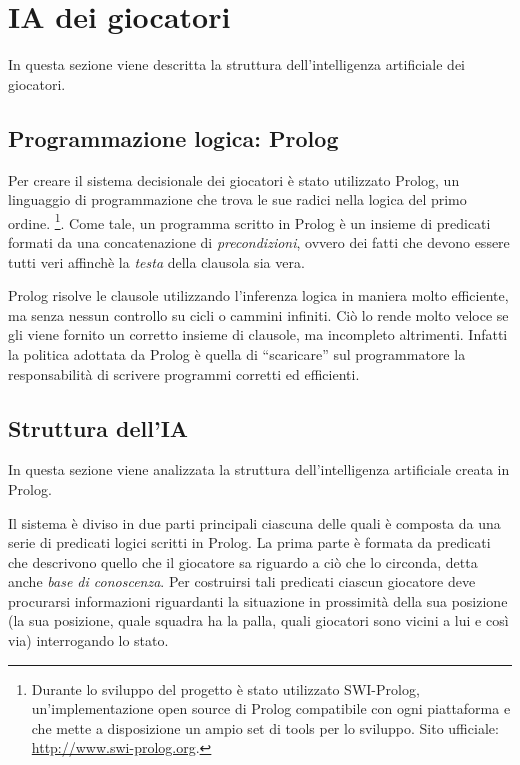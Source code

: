 
\section{IA dei giocatori}
\label{sec:ai_giocatori}

In questa sezione viene descritta la struttura dell'intelligenza artificiale dei giocatori.

\subsection{Programmazione logica: Prolog}
Per creare il sistema decisionale dei giocatori è stato utilizzato Prolog, un linguaggio di programmazione che trova le sue radici nella logica del primo ordine.
\footnote{Durante lo sviluppo del progetto \`{e} stato utilizzato SWI-Prolog, un'implementazione open source di Prolog compatibile con ogni piattaforma e che mette a disposizione un ampio set di tools per lo sviluppo. Sito ufficiale: \href{http://www.swi-prolog.org/}{http://www.swi-prolog.org}.}.
Come tale, un programma scritto in Prolog \`{e} un insieme di predicati formati da una concatenazione di \emph{precondizioni}, ovvero dei fatti che devono essere tutti veri affinch\`{e} la \emph{testa} della clausola sia vera.

Prolog risolve le clausole utilizzando l'inferenza logica in maniera molto efficiente, ma senza nessun controllo su cicli o cammini infiniti. Ci\`{o} lo rende molto veloce se gli viene fornito un corretto insieme di clausole, ma incompleto altrimenti. Infatti la politica adottata da Prolog \`{e} quella di ``scaricare'' sul programmatore la responsabilit\`{a} di scrivere programmi corretti ed efficienti.\\

\subsection{Struttura dell'IA}
\label{sec:struct_ia}
In questa sezione viene analizzata la struttura dell'intelligenza artificiale creata in Prolog.

Il sistema \`{e} diviso in due parti principali ciascuna delle quali \`{e} composta da una serie di predicati logici scritti in Prolog. La prima parte \`{e} formata da predicati che descrivono quello che il giocatore sa riguardo a ci\`{o} che lo circonda, detta anche \emph{base di conoscenza}. Per costruirsi tali predicati ciascun giocatore deve procurarsi informazioni riguardanti la situazione in prossimit\`{a} della sua posizione (la sua posizione, quale squadra ha la palla, quali giocatori sono vicini a lui e cos\`{i} via) interrogando lo stato.

